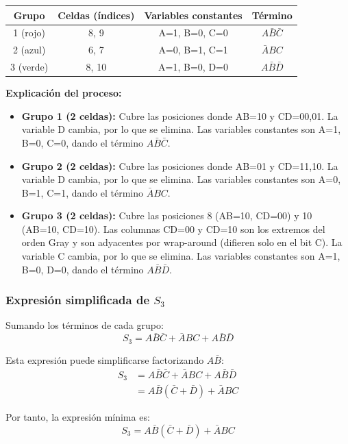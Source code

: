 \documentclass[11pt,a4paper]{article}
\begin{document}
\begin{center}
\begin{tabular}{|c|c|c|c|}
\hline
\textbf{Grupo} & \textbf{Celdas (índices)} & \textbf{Variables constantes} & \textbf{Término} \\
\hline
1 (rojo) & 8, 9 & A=1, B=0, C=0 & $A\bar{B}\bar{C}$ \\
\hline
2 (azul) & 6, 7 & A=0, B=1, C=1 & $\bar{A}BC$ \\
\hline
3 (verde) & 8, 10 & A=1, B=0, D=0 & $A\bar{B}\bar{D}$ \\
\hline
\end{tabular}
\end{center}

\textbf{Explicación del proceso:}
\begin{itemize}
    \item \textbf{Grupo 1 (2 celdas):} Cubre las posiciones donde AB=10 y CD=00,01. La variable D cambia, por lo que se elimina. Las variables constantes son A=1, B=0, C=0, dando el término $A\bar{B}\bar{C}$.
    \item \textbf{Grupo 2 (2 celdas):} Cubre las posiciones donde AB=01 y CD=11,10. La variable D cambia, por lo que se elimina. Las variables constantes son A=0, B=1, C=1, dando el término $\bar{A}BC$.
    \item \textbf{Grupo 3 (2 celdas):} Cubre las posiciones 8 (AB=10, CD=00) y 10 (AB=10, CD=10). Las columnas CD=00 y CD=10 son los extremos del orden Gray y son adyacentes por wrap-around (difieren solo en el bit C). La variable C cambia, por lo que se elimina. Las variables constantes son A=1, B=0, D=0, dando el término $A\bar{B}\bar{D}$.
\end{itemize}

\subsubsection*{Expresión simplificada de $S_3$}

Sumando los términos de cada grupo:
\[
\boxed{S_3 = A\bar{B}\bar{C} + \bar{A}BC + A\bar{B}\bar{D}}
\]

Esta expresión puede simplificarse factorizando $A\bar{B}$:
\begin{align*}
S_3 &= A\bar{B}\bar{C} + \bar{A}BC + A\bar{B}\bar{D} \\
    &= A\bar{B}(\bar{C} + \bar{D}) + \bar{A}BC
\end{align*}

Por tanto, la expresión mínima es:
\[
\boxed{S_3 = A\bar{B}(\bar{C} + \bar{D}) + \bar{A}BC}
\]
\end{document}
